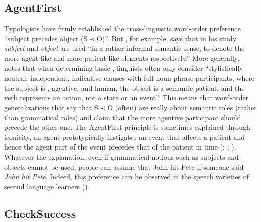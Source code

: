 \documentclass[output=paper]{LSP/langsci}
\begin{document}
\subsection{AgentFirst}\label{17-le-sec:Event-AgentFirst}
Typologists have firmly established the cross-linguistic word-order preference ``subject precedes object (S$\prec$O)''. But \cite{Dryer2013Order}, for example, says that in his study \textit{subject} and \textit{object} are used ``in a rather informal semantic sense, to denote the more agent-like and more patient-like elements respectively.'' More generally, \citet[8]{Siewierska1988Word} notes that when determining basic , linguists often only consider ``stylistically neutral, independent, indicative clauses with full noun phrase participants, where the subject is , agentive, and human, the object is a  semantic patient, and the verb represents an action, not a state or an event''. This means that word-order generalizations that say that S$\prec$O (often) are really about semantic roles (rather than grammatical roles) and claim that the more agentive participant should precede the other one. The AgentFirst principle is sometimes explained through iconicity, an agent prototypically instigates an event that affects a patient and hence the agent part of the event precedes that of the patient in time (\citealt{DeLancey1981Interpretation}; \citealt[185]{Croft1991Syntactic}; \citealt{Anderson2006Modern}). Whatever the explanation, even if grammatical notions such as subjects and objects cannot be used, people can assume that John hit Pete if someone said \textit{John hit Pete}. Indeed, this preference can be observed in the speech varieties of second language learners (\cf \citealt{Kleietal1997Basic}). 

\subsection{CheckSuccess}\label{17-le-sec:Event-CheckSuccess}
\end{document}

